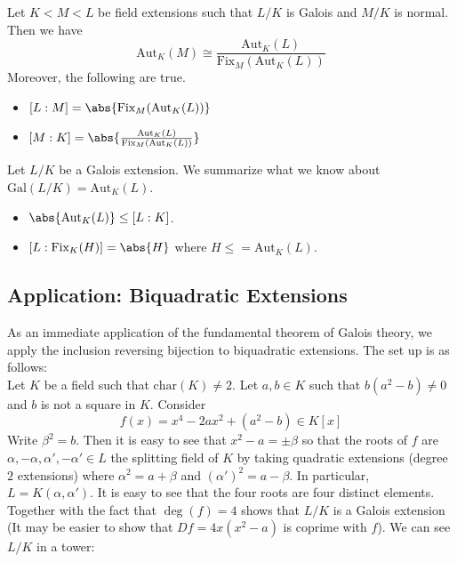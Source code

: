 \documentclass[a4paper]{article}
\begin{document}
\begin{prp}{}{} Let $K<M<L$ be field extensions such that $L/K$ is Galois and $M/K$ is normal. Then we have $$\text{Aut}_K(M)\cong\frac{\text{Aut}_K(L)}{\text{Fix}_M(\text{Aut}_K(L))}$$ Moreover, the following are true. 
\begin{itemize}
\item $[L:M]=\abs{\text{Fix}_M(\text{Aut}_K(L))}$
\item $[M:K]=\abs{\frac{\text{Aut}_K(L)}{\text{Fix}_M(\text{Aut}_K(L))}}$
\end{itemize}
\end{prp}

Let $L/K$ be a Galois extension. We summarize what we know about $\text{Gal}(L/K)=\text{Aut}_K(L)$. 
\begin{itemize}
\item $\abs{\text{Aut}_K(L)}\leq [L:K]$. 
\item $[L:\text{Fix}_K(H)]=\abs{H}$ where $H\leq=\text{Aut}_K(L)$. 
\end{itemize}

\subsection{Application: Biquadratic Extensions}
As an immediate application of the fundamental theorem of Galois theory, we apply the inclusion reversing bijection to biquadratic extensions. The set up is as follows: \\

Let $K$ be a field such that $\text{char}(K)\neq 2$. Let $a,b\in K$ such that $b(a^2-b)\neq 0$ and $b$ is not a square in $K$. Consider $$f(x)=x^4-2ax^2+(a^2-b)\in K[x]$$ Write $\beta^2=b$. Then it is easy to see that $x^2-a=\pm\beta$ so that the roots of $f$ are $\alpha,-\alpha,\alpha',-\alpha'\in L$ the splitting field of $K$ by taking quadratic extensions (degree $2$ extensions) where $\alpha^2=a+\beta$ and $(\alpha')^2=a-\beta$. In particular, $L=K(\alpha,\alpha')$. It is easy to see that the four roots are four distinct elements. Together with the fact that $\deg(f)=4$ shows that $L/K$ is a Galois extension (It may be easier to show that $Df=4x(x^2-a)$ is coprime with $f$). We can see $L/K$ in a tower: \\
\\
\end{document}
